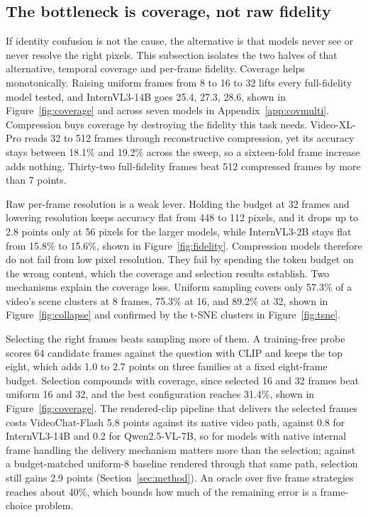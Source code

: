 \documentclass{article}
\begin{document}
\subsection{The bottleneck is coverage, not raw fidelity}
\label{sec:coverage}
If identity confusion is not the cause, the alternative is that models never see or never resolve the right pixels. This subsection isolates the two halves of that alternative, temporal coverage and per-frame fidelity. Coverage helps monotonically. Raising uniform frames from 8 to 16 to 32 lifts every full-fidelity model tested, and InternVL3-14B goes 25.4, 27.3, 28.6, shown in Figure~\ref{fig:coverage} and across seven models in Appendix~\ref{app:covmulti}. Compression buys coverage by destroying the fidelity this task needs. Video-XL-Pro reads 32 to 512 frames through reconstructive compression, yet its accuracy stays between 18.1\% and 19.2\% across the sweep, so a sixteen-fold frame increase adds nothing. Thirty-two full-fidelity frames beat 512 compressed frames by more than 7 points.

Raw per-frame resolution is a weak lever. Holding the budget at 32 frames and lowering resolution keeps accuracy flat from 448 to 112 pixels, and it drops up to 2.8 points only at 56 pixels for the larger models, while InternVL3-2B stays flat from 15.8\% to 15.6\%, shown in Figure~\ref{fig:fidelity}. Compression models therefore do not fail from low pixel resolution. They fail by spending the token budget on the wrong content, which the coverage and selection results establish. Two mechanisms explain the coverage loss. Uniform sampling covers only 57.3\% of a video's scene clusters at 8 frames, 75.3\% at 16, and 89.2\% at 32, shown in Figure~\ref{fig:collapse} and confirmed by the t-SNE clusters in Figure~\ref{fig:tsne}.

Selecting the right frames beats sampling more of them. A training-free probe scores 64 candidate frames against the question with CLIP and keeps the top eight, which adds 1.0 to 2.7 points on three families at a fixed eight-frame budget. Selection compounds with coverage, since selected 16 and 32 frames beat uniform 16 and 32, and the best configuration reaches 31.4\%, shown in Figure~\ref{fig:coverage}. The rendered-clip pipeline that delivers the selected frames costs VideoChat-Flash 5.8 points against its native video path, against 0.8 for InternVL3-14B and 0.2 for Qwen2.5-VL-7B, so for models with native internal frame handling the delivery mechanism matters more than the selection; against a budget-matched uniform-8 baseline rendered through that same path, selection still gains 2.9 points (Section~\ref{sec:method}). An oracle over five frame strategies reaches about 40\%, which bounds how much of the remaining error is a frame-choice problem.
\end{document}
